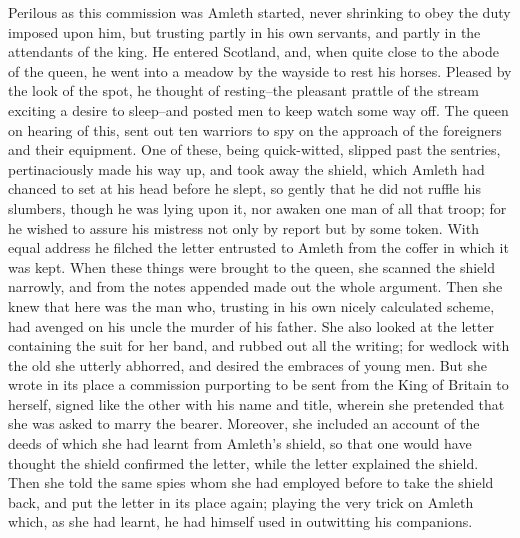 \documentclass[10pt,a4paper]{report}
\begin{document}
Perilous as this commission was Amleth started, never shrinking to obey the duty imposed upon him, but trusting partly in his own servants, and partly in the attendants of the king. He entered Scotland, and, when quite close to the abode of the queen, he went into a meadow by the wayside to rest his horses. Pleased by the look of the spot, he thought of resting--the pleasant prattle of the stream exciting a desire to sleep--and posted men to keep watch some way off. The queen on hearing of this, sent out ten warriors to spy on the approach of the foreigners and their equipment. One of these, being quick-witted, slipped past the sentries, pertinaciously made his way up, and took away the shield, which Amleth had chanced to set at his head before he slept, so gently that he did not ruffle his slumbers, though he was lying upon it, nor awaken one man of all that troop; for he wished to assure his mistress not only by report but by some token. With equal address he filched the letter entrusted to Amleth from the coffer in which it was kept. When these things were brought to the queen, she scanned the shield narrowly, and from the notes appended made out the whole argument. Then she knew that here was the man who, trusting in his own nicely calculated scheme, had avenged on his uncle the murder of his father. She also looked at the letter containing the suit for her band, and rubbed out all the writing; for wedlock with the old she utterly abhorred, and desired the embraces of young men. But she wrote in its place a commission purporting to be sent from the King of Britain to herself, signed like the other with his name and title, wherein she pretended that she was asked to marry the bearer. Moreover, she included an account of the deeds of which she had learnt from Amleth's shield, so that one would have thought the shield confirmed the letter, while the letter explained the shield. Then she told the same spies whom she had employed before to take the shield back, and put the letter in its place again; playing the very trick on Amleth which, as she had learnt, he had himself used in outwitting his companions.\\
\end{document}
